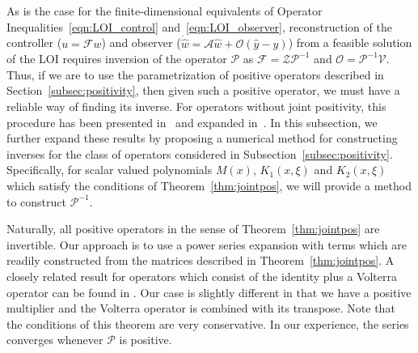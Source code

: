 \documentclass[9pt,journal,twocolumn]{IEEEtran}
\begin{document}
As is the case for the finite-dimensional equivalents of Operator Inequalities~\eqref{eqn:LOI_control} and~\eqref{eqn:LOI_observer}, reconstruction of the controller ($u=\mathcal{F}w$) and observer ($\dot{\hat w} = \mathcal{A}\hat w + \mathcal{O}(\hat y - y)$) from a feasible solution of the LOI requires inversion of the operator $\mathcal{P}$ as $\mathcal{F} = \mathcal{Z}\mathcal{P}^{-1}$ and $\mathcal{O} = \mathcal{P}^{-1}\mathcal{V}$. Thus, if we are to use the parametrization of positive operators described in Section~\ref{subsec:positivity}, then given such a positive operator, we must have a reliable way of finding its inverse. For operators without joint positivity, this procedure has been presented in~\cite{peet2009inverses} and expanded in~\cite{peet2013inverses}. In this subsection, we further expand these results by proposing a numerical method for constructing inverses for the class of operators considered in Subsection~\ref{subsec:positivity}.
 Specifically, for scalar valued polynomials $M(x)$, $K_1(x,\xi)$ and $K_2(x,\xi)$ which satisfy the conditions of Theorem~\ref{thm:jointpos}, we will provide a method to construct $\mathcal{P}^{-1}$.

Naturally, all positive operators in the sense of Theorem~\ref{thm:jointpos} are invertible. Our approach is to use a power series expansion with terms which are readily constructed from the matrices described in Theorem~\ref{thm:jointpos}. A closely related result for operators which consist of the identity plus a Volterra operator can be found in \cite[Sec 1.99]{shilov1974elementary}. Our case is slightly different in that we have a positive multiplier  and the Volterra operator is combined with its transpose. Note that the conditions of this theorem are very conservative. In our experience, the series converges whenever $\mathcal{P}$ is positive.
\end{document}
